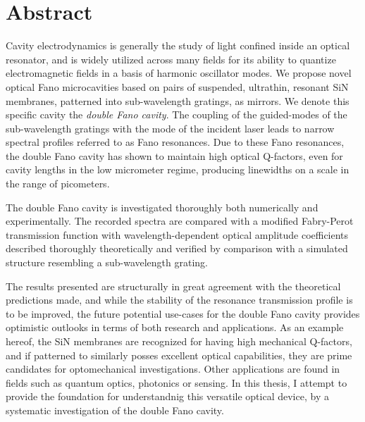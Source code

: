 \section*{Abstract}

Cavity electrodynamics is generally the study of light confined inside an optical resonator, and is widely utilized across many fields for its ability to quantize electromagnetic fields in a basis of harmonic oscillator modes. We propose novel optical Fano microcavities based on pairs of suspended, ultrathin, resonant SiN membranes, patterned into sub-wavelength gratings, as mirrors. We denote this specific cavity the \emph{double Fano cavity}. The coupling of the guided-modes of the sub-wavelength gratings with the mode of the incident laser leads to narrow spectral profiles referred to as Fano resonances. Due to these Fano resonances, the double Fano cavity has shown to maintain high optical Q-factors, even for cavity lengths in the low micrometer regime, producing linewidths on a scale in the range of picometers.  

The double Fano cavity is investigated thoroughly both numerically and experimentally. The recorded spectra are compared with a modified Fabry-Perot transmission function with wavelength-dependent optical amplitude coefficients described thoroughly theoretically and verified by comparison with a simulated structure resembling a sub-wavelength grating. 

The results presented are structurally in great agreement with the theoretical predictions made, and while the stability of the resonance transmission profile is to be improved, the future potential use-cases for the double Fano cavity provides optimistic outlooks in terms of both research and applications. As an example hereof, the SiN membranes are recognized for having high mechanical Q-factors, and if patterned to similarly posses excellent optical capabilities, they are prime candidates for optomechanical investigations. Other applications are found in fields such as quantum optics, photonics or sensing. In this thesis, I attempt to provide the foundation for understandnig this versatile optical device, by a systematic investigation of the double Fano cavity.